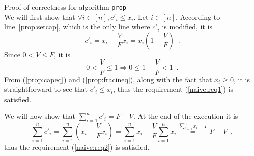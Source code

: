\begin{sepproof}{Proof of correctness for algorithm \texttt{prop}} \ \\
  We will first show that $\forall i \in [n], c'_i \leq x_i$. Let $i \in [n]$. According to line~\ref{prop:setcap}, which
  is the only line where $c'_i$ is modified, it is
  \begin{equation}
  \label{prop:capeq}
    c'_i = x_i - \frac{V}{F}x_i = x_i\left(1 - \frac{V}{F}\right) \enspace.
  \end{equation}
  Since $0 < V \leq F$, it is
  \begin{equation}
  \label{prop:fracineq}
    0 < \frac{V}{F} \leq 1 \Rightarrow 0 \leq 1 - \frac{V}{F} < 1 \enspace.
  \end{equation}
  From (\ref{prop:capeq}) and (\ref{prop:fracineq}), along with the fact that $x_i \geq 0$, it is straightforward to see that
  $c'_i \leq x_i$, thus the requirement (\ref{naive:req1}) is satisfied.

  We will now show that $\sum\limits_{i=1}^nc'_i = F - V$. At the end of the execution it is
  \begin{equation*}
    \sum\limits_{i=1}^nc'_i = \sum\limits_{i=1}^n\left(x_i - \frac{V}{F}x_i\right) =
    \sum\limits_{i=1}^nx_i - \frac{V}{F}\sum\limits_{i=1}^nx_i \overset{\sum\limits_{i=1}^nx_i = F}{=} F - V \enspace,
  \end{equation*}
  thus the requirement (\ref{naive:req2}) is satisfied.
\end{sepproof}

